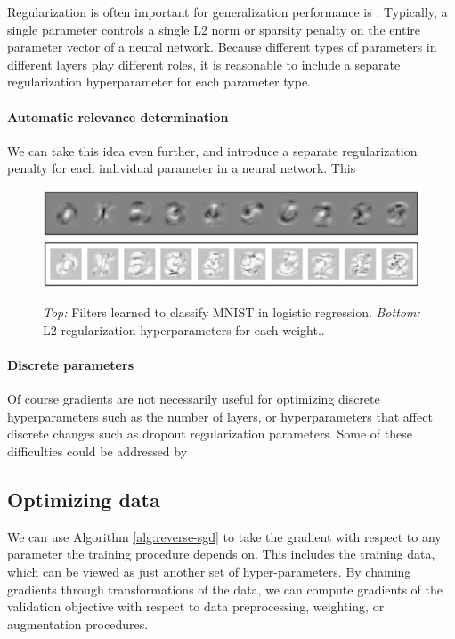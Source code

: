 \documentclass{article}
\begin{document}
Regularization is often important for generalization performance is .
Typically, a single parameter controls a single L2 norm or sparsity penalty on the entire parameter vector of a neural network.
Because different types of parameters in different layers play different roles, it is reasonable to include a separate regularization hyperparameter for each parameter type.

\paragraph{Automatic relevance determination}
We can take this idea even further, and introduce a separate regularization penalty for each individual parameter in a neural network.
This

\begin{figure}[h!]
\begin{center}
\includegraphics[width=\columnwidth]{../experiments/Jan_21_nn_ard/2/weights.pdf}
\includegraphics[width=\columnwidth]{../experiments/Jan_21_nn_ard/2/penalties.pdf}
\caption{\emph{Top:} Filters learned to classify MNIST in logistic regression.
\emph{Bottom:} L2 regularization hyperparameters for each weight..}
\label{fig:logistic ard}
\end{center}
\end{figure} 

\paragraph{Discrete parameters}
Of course gradients are not necessarily useful for optimizing discrete hyperparameters such as the number of layers, or hyperparameters that affect discrete changes such as dropout regularization parameters.
Some of these difficulties could be addressed by 

\subsection{Optimizing data}

We can use Algorithm \ref{alg:reverse-sgd} to take the gradient with respect to any parameter the training procedure depends on.
This includes the training data, which can be viewed as just another set of hyper-parameters.
By chaining gradients through transformations of the data, we can compute gradients of the validation objective with respect to data preprocessing, weighting, or augmentation procedures.
\end{document}
